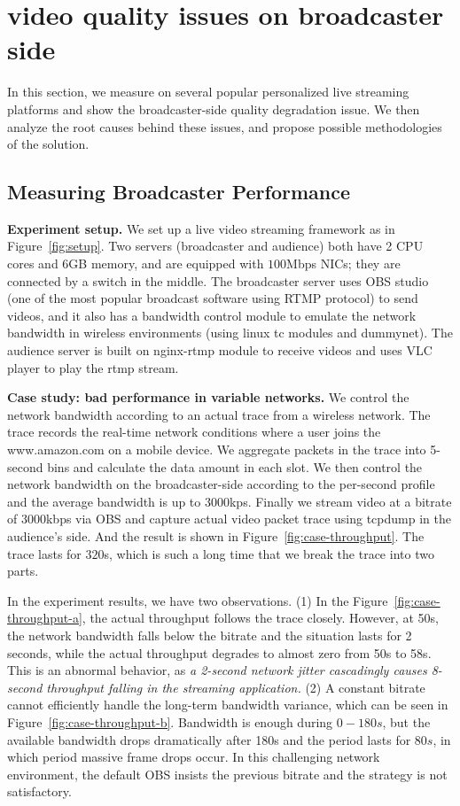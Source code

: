 \section{video quality issues on broadcaster side}

In this section, we measure on several popular personalized live streaming platforms and show the broadcaster-side quality degradation issue. We then analyze the root causes behind these issues, and propose possible methodologies of the solution.

\subsection{Measuring Broadcaster Performance}

\textbf{Experiment setup.} We set up a live video streaming framework as in Figure~\ref{fig:setup}. Two servers (broadcaster and audience) both have 2 CPU cores and 6GB memory, and are equipped with $100$Mbps NICs; they are connected by a switch in the middle.
The broadcaster server uses OBS studio\cite{OBS} (one of the most popular broadcast software using RTMP protocol) to send videos, and it also has a bandwidth control module to emulate the network bandwidth in wireless environments (using linux tc modules and dummynet\cite{dummynet}). The audience server is built on nginx-rtmp module to receive videos and uses VLC player to play the rtmp stream.


\textbf{Case study: bad performance in variable networks.} We control the network bandwidth according to an actual trace from a wireless network. The trace records the real-time network conditions where a user joins the www.amazon.com on a mobile device. We aggregate packets in the trace into 5-second bins and calculate the data amount in each slot. We then control the network bandwidth on the broadcaster-side according to the per-second profile and the average bandwidth is up to $3000$kps. Finally we stream video at a bitrate of $3000$kbps via OBS and capture actual video packet trace using tcpdump in the audience's side. And the result is shown in Figure~\ref{fig:case-throughput}.  The trace lasts for $320$s, which is such a long time that we break the trace into two parts.

In the experiment results, we have two observations. (1) In the Figure~\ref{fig:case-throughput-a}, the actual throughput follows the trace closely. However, at 50s, the network bandwidth falls below the bitrate and the situation lasts for 2 seconds, while the actual throughput degrades to almost zero from 50s to 58s. This is an abnormal behavior, as \textit{a 2-second network jitter cascadingly causes 8-second throughput falling in the streaming application.} (2) A constant bitrate cannot efficiently handle the long-term bandwidth variance, which can be seen in Figure~\ref{fig:case-throughput-b}. Bandwidth is enough during $0-180s$, but the available bandwidth drops dramatically after 180s and the period lasts for $80s$, in which period massive frame drops occur. In this challenging network environment, the default OBS insists the previous bitrate and the strategy is not satisfactory.

